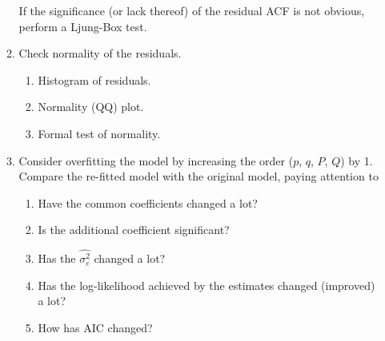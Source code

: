 \documentclass[12pt]{article}
\begin{document}
\begin{enumerate}
\begin{enumerate}
        If the significance (or lack thereof) of the residual ACF is
        not obvious,
        perform a Ljung-Box test.
    \item Check normality of the residuals.
        \begin{enumerate}
        \item Histogram of residuals.
        \item Normality (QQ) plot.
        \item Formal test of normality.
        \end{enumerate}
    \item Consider overfitting the model by increasing
        the order ($p$, $q$, $P$, $Q$) by 1.
        Compare the re-fitted model with the original model,
        paying attention to
        \begin{enumerate}
        \item Have the common coefficients changed a lot?
        \item Is the additional coefficient significant?
        \item Has the $\hat{\sigma^2_e}$ changed a lot?
        \item Has the log-likelihood achieved by the estimates changed
        (improved) a lot?
        \item How has AIC changed?
        \end{enumerate}
\end{enumerate}
\end{enumerate}
\end{document}
